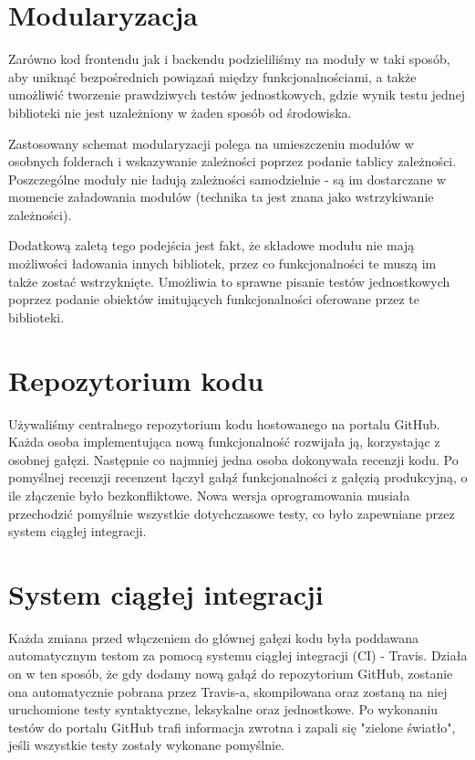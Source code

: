 \documentclass[a4paper,twoside,openright,11pt]{report}
\begin{document}
  \section{Modularyzacja}
\par Zarówno kod frontendu jak i backendu podzieliliśmy na moduły w taki sposób, aby uniknąć bezpośrednich powiązań między funkcjonalnościami, a także umożliwić tworzenie prawdziwych testów
jednostkowych, gdzie wynik testu jednej biblioteki nie jest uzależniony w żaden sposób od środowiska. 
\par Zastosowany schemat modularyzacji polega na umieszczeniu modułów w osobnych folderach i wskazywanie zależności poprzez podanie tablicy zależności. Poszczególne moduły nie ładują zależności samodzielnie - są im dostarczane w momencie załadowania modułów (technika ta jest znana jako wstrzykiwanie zależności).
\par Dodatkową zaletą tego podejścia jest fakt, że składowe modułu nie mają możliwości ładowania innych bibliotek, przez co funkcjonalności te muszą im także zostać wstrzyknięte. Umożliwia to
sprawne pisanie testów jednostkowych poprzez podanie obiektów imitujących funkcjonalności oferowane przez te biblioteki.

  \section{Repozytorium kodu}
\par Używaliśmy centralnego repozytorium kodu hostowanego na portalu GitHub. \cite{repozytorium} Każda osoba implementująca nową funkcjonalność rozwijała ją, korzystając z osobnej gałęzi. Następnie co najmniej jedna osoba dokonywała recenzji kodu. Po pomyślnej recenzji recenzent łączył gałąź funkcjonalności z gałęzią produkcyjną, o ile złączenie było bezkonfliktowe. Nowa wersja oprogramowania musiała przechodzić pomyślnie wszystkie dotychczasowe testy, co było zapewniane przez system ciągłej integracji. 

  \section{System ciągłej integracji}
\par Każda zmiana przed włączeniem do głównej gałęzi kodu była poddawana automatycznym testom za pomocą systemu ciągłej integracji (CI) - Travis. \cite{travis} Działa on w ten sposób, że gdy dodamy nową gałąź do repozytorium GitHub, zostanie ona automatycznie pobrana przez Travis-a, skompilowana oraz zostaną na niej uruchomione testy syntaktyczne, leksykalne oraz jednostkowe. Po wykonaniu testów do portalu GitHub trafi informacja zwrotna i zapali się "zielone światło", jeśli wszystkie testy zostały wykonane pomyślnie. 
\end{document}
